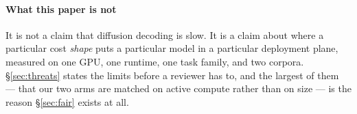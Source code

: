 \paragraph{What this paper is not}
It is not a claim that diffusion decoding is slow. It is a claim about where a
particular cost \emph{shape} puts a particular model in a particular
deployment plane, measured on one GPU, one runtime, one task family, and two
corpora. \S\ref{sec:threats} states the limits before a reviewer has to, and
the largest of them --- that our two arms are matched on active compute rather
than on size --- is the reason \S\ref{sec:fair} exists at all.
